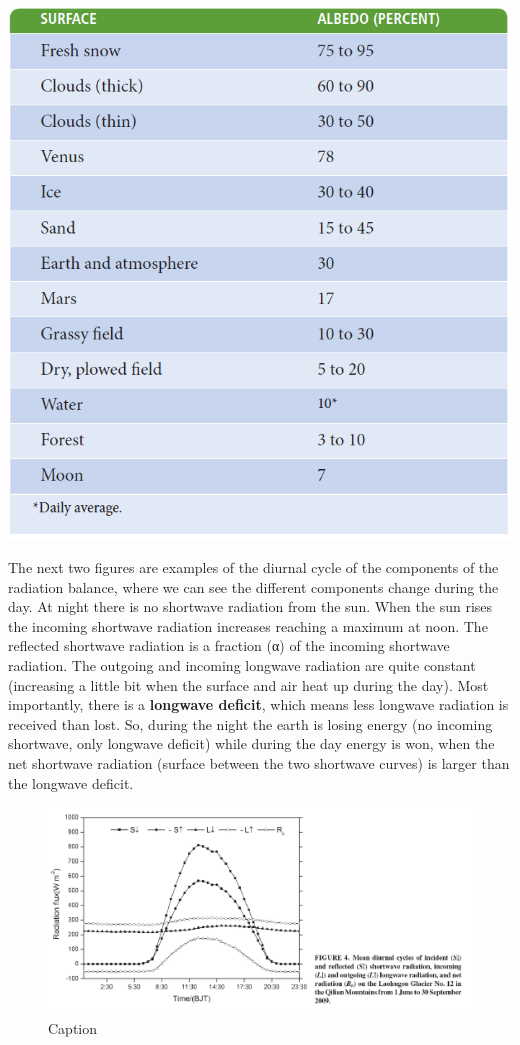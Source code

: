 \documentclass[oneside]{book}
\begin{document}
\pagebreak

\begin{center}
\label{table:albedos}

\begin{center}\includegraphics[width=0.8\linewidth]{figures/Table13} \end{center}
\end{center}

The next two figures are examples of the diurnal cycle of the components
of the radiation balance, where we can see the different components
change during the day. At night there is no shortwave radiation from the
sun. When the sun rises the incoming shortwave radiation increases
reaching a maximum at noon. The reflected shortwave radiation is a
fraction (α) of the incoming shortwave radiation. The outgoing and
incoming longwave radiation are quite constant (increasing a little bit
when the surface and air heat up during the day). Most importantly,
there is a \textbf{longwave deficit}, which means less longwave
radiation is received than lost. So, during the night the earth is
losing energy (no incoming shortwave, only longwave deficit) while
during the day energy is won, when the net shortwave radiation (surface
between the two shortwave curves) is larger than the longwave deficit.

\begin{figure}

{\centering \includegraphics[width=0.77\linewidth]{figures/Figure136} 

}

\caption{Caption}\label{fig:RadiationCycle}
\end{figure}
\end{document}

